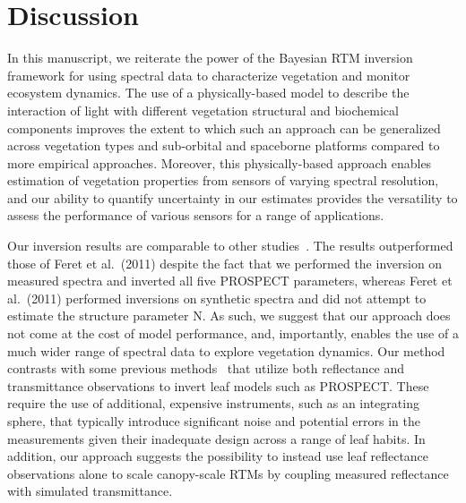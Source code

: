 \section{Discussion}\label{sec:pecanrtm-discussion}

In this manuscript, we reiterate the power of the Bayesian RTM inversion framework for using spectral data to characterize vegetation and monitor ecosystem dynamics.
The use of a physically-based model to describe the interaction of light with different vegetation structural and biochemical components improves the extent to which such an approach can be generalized across vegetation types and sub-orbital and spaceborne platforms compared to more empirical approaches.
Moreover, this physically-based approach enables estimation of vegetation properties from sensors of varying spectral resolution, and our ability to quantify uncertainty in our estimates provides the versatility to assess the performance of various sensors for a range of applications. 

Our inversion results are comparable to other studies~\cite{feret_2008_prospect,feret_2011_optimizing,li_2011_retrieval,divittorio_2009_enhancing}.
The results outperformed those of Feret et al.~(2011) despite the fact that we performed the inversion on measured spectra and inverted all five PROSPECT parameters,
whereas Feret et al.~(2011) performed inversions on synthetic spectra and did not attempt to estimate the structure parameter N. \nocite{feret_2011_optimizing}
As such, we suggest that our approach does not come at the cost of model performance, and, importantly, enables the use of a much wider range of spectral data to explore vegetation dynamics.
Our method contrasts with some previous methods~\cite[e.g., ]{feret_2008_prospect,feret_2011_optimizing} that utilize both reflectance and transmittance observations to invert leaf models such as PROSPECT\@.
These require the use of additional, expensive instruments, such as an integrating sphere, that typically introduce significant noise and potential errors in the measurements given their inadequate design across a range of leaf habits.
In addition, our approach suggests the possibility to instead use leaf reflectance observations alone to scale canopy-scale RTMs by coupling measured reflectance with simulated transmittance.

